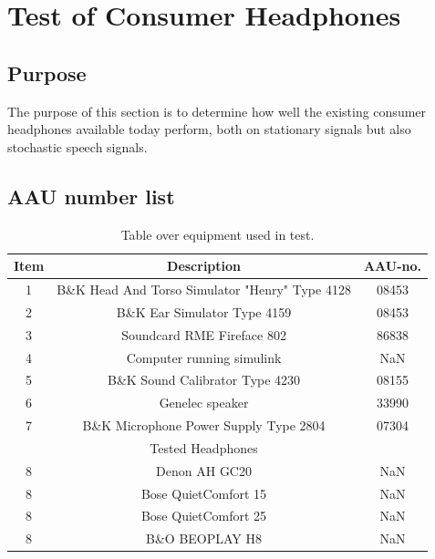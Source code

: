 
\section{Test of Consumer Headphones}

\subsection{Purpose}
The purpose of this section is to determine how well the existing consumer headphones available today perform, both on stationary signals but also stochastic speech signals.




\subsection{AAU number list}
\begin{table}[H]
	\centering
	\begin{tabular}{ c c c } \toprule
		{Item}	& {Description} 						& {AAU-no}. \\ \bottomrule 
		1	&	B\&K Head And Torso Simulator "Henry" Type 4128	& 08453	\\
		2	&	B\&K Ear Simulator Type 4159				& 08453		\\
		3	&	Soundcard RME Fireface 802					& 86838		\\
		4	&	Computer running simulink					& NaN		\\
		5	&	B\&K Sound Calibrator Type 4230				& 08155		\\ 
		6	&	Genelec speaker								& 33990		\\ 
		7	& 	B\&K Microphone Power Supply Type 2804		& 07304		\\
		\bottomrule
		& Tested Headphones & \\
		\bottomrule
	
		8 & Denon AH GC20 & NaN \\
		8 & Bose QuietComfort 15 & NaN \\
		8 & Bose QuietComfort 25 & NaN \\
		8 & B\&O BEOPLAY H8 & NaN \\
			\bottomrule
	\end{tabular}
	\caption{Table over equipment used in test.}
	\label{tab:UsedEquipmentListConsumerHP}
\end{table}



